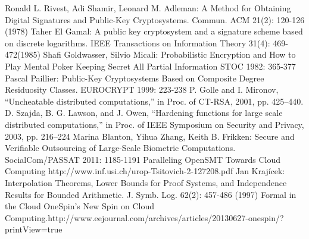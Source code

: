 \documentclass[runningheads,a4paper]{llncs}
\begin{document}
\newline[28]	Ronald L. Rivest, Adi Shamir, Leonard M. Adleman: A Method for Obtaining Digital Signatures and Public-Key Cryptosystems. Commun. ACM 21(2): 120-126 (1978)
\newline[29]	Taher El Gamal: A public key cryptosystem and a signature scheme based on discrete logarithms. IEEE Transactions on Information Theory 31(4): 469-472(1985)
\newline[30]	Shafi Goldwasser, Silvio Micali: Probabilistic Encryption and How to Play Mental Poker Keeping Secret All Partial Information STOC 1982: 365-377
\newline[31]	Pascal Paillier: Public-Key Cryptosystems Based on Composite Degree Residuosity Classes. EUROCRYPT 1999: 223-238
\newline[32]	P. Golle and I. Mironov, “Uncheatable distributed computations,” in Proc. of CT-RSA, 2001, pp. 425–440.
\newline[33]	D. Szajda, B. G. Lawson, and J. Owen, “Hardening functions for large scale distributed computations,” in Proc. of IEEE Symposium on Security and Privacy, 2003, pp. 216–224
\newline[34]	Marina Blanton, Yihua Zhang, Keith B. Frikken: Secure and Verifiable Outsourcing of Large-Scale Biometric Computations. SocialCom/PASSAT 2011: 1185-1191
\newline[35]	Paralleling OpenSMT Towards Cloud Computing http://www.inf.usi.ch/urop-Tsitovich-2-127208.pdf‎
\newline[36]	Jan Krajícek: Interpolation Theorems, Lower Bounds for Proof Systems, and Independence Results for Bounded Arithmetic. J. Symb. Log. 62(2): 457-486 (1997)
\newline[37]	Formal in the Cloud OneSpin’s New Spin on Cloud Computing.http://www.eejournal.com/archives/articles/20130627-onespin/?printView=true
\end{document}
